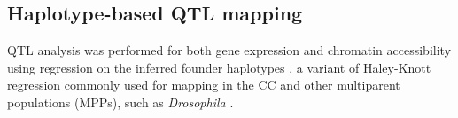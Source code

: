\documentclass[9pt,twocolumn,twoside]{gsajnl}
\newcommand{\WVinline}[1]{\textcolor{red}{#1}}
\begin{document}

\subsection{Haplotype-based QTL mapping}

QTL analysis was performed for both gene expression and chromatin accessibility using regression on the inferred founder haplotypes \citep{Mott2000}, a variant of Haley-Knott regression \citep{Haley1992,Martinez1992} commonly used for mapping in the CC \citep{Valdar2006c,Aylor2011,Gralinski2015,Kelada2016,Donoghue2017,Keele2019} and other multiparent populations (MPPs), such as \textit{Drosophila} \citep{King2012}.
\end{document}
